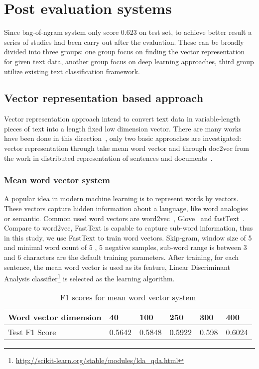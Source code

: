 \documentclass[11pt]{article}
\begin{document}
\section{Post evaluation systems}
Since bag-of-ngram system only score 0.623 on test set, to achieve better result a series of studies had been carry out after the evaluation. These can be broadly divided into three groups: one group focus on finding the vector representation for given text data, another group focus on deep learning approaches, third group utilize existing text classification framework. %



\subsection{Vector representation based approach}

Vector representation approach intend to convert text data in variable-length pieces of text into a length fixed low dimension vector. There are many works have been done in this direction~\cite{2014arXiv1408.5882K,2015arXiv151108198W,Kusner2015From,Kenter2016Siamese,Ye2017Determining}, only two basic approaches are investigated: vector representation through take mean word vector and through doc2vec from the work in distributed representation of sentences and documents~\cite{Le2014Distributed}. 

\subsubsection{Mean word vector system}
A popular idea in modern machine learning is to represent words by vectors. These vectors capture hidden information about a language, like word analogies or semantic. Common used word vectors are word2vec~\cite{Mikolov2013Distributed}, Glove~\cite{Pennington2014Glove} and fastText~\cite{bojanowski2017enriching}. Compare to word2vec, FastText is capable to capture sub-word information, thus in this study, we use FastText to train word vectors. Skip-gram, window size of 5 and minimal word count of 5 , 5 negative samples, sub-word range is between 3 and 6 characters are the default training parameters. After training, for each sentence, the mean word vector is used as its feature, Linear Discriminant Analysis classifier\footnote{\url{http://scikit-learn.org/stable/modules/lda_qda.html}} is selected as the learning algorithm.

\begin{table}[h]
	\centering
	
	
	\begin{tabular}{|l|l|l|l|l|l|}
		\hline
		Word vector dimension & 40 & 100 & 250 & 300 & 400 \\ \hline
		Test F1 Score & 0.5642 & 0.5848 & 0.5922 & 0.598 & 0.6024 \\ \hline
	\end{tabular}
	\caption{F1 scores for mean word vector system}
	\label{doc2vec}
\end{table}
\end{document}
